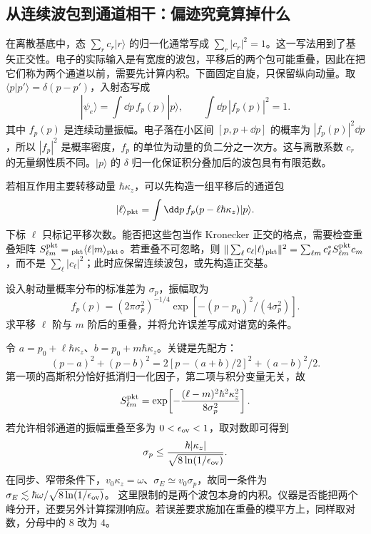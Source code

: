 \subsection{从连续波包到通道相干：偏迹究竟算掉什么}
\label{sec:electron-channel-coherence-worked}

在离散基底中，态 $\sum_r c_r|r\rangle$ 的归一化通常写成 $\sum_r|c_r|^2=1$。这一写法用到了基矢正交性。电子的实际输入是有宽度的波包，平移后的两个包可能重叠，因此在把它们称为两个通道以前，需要先计算内积。下面固定自旋，只保留纵向动量。取 $\langle p|p'\rangle=\delta(p-p')$，入射态写成
\begin{equation}
 |\psi_e\rangle=\int\dd p\,f_p(p)|p\rangle,\qquad
 \int\dd p\,|f_p(p)|^2=1.
 \label{eq:electron-channel-packet-normalization}
\end{equation}
其中 $f_p(p)$ 是连续动量振幅。电子落在小区间 $[p,p+\dd p]$ 的概率为 $|f_p(p)|^2\dd p$，所以 $|f_p|^2$ 是概率密度，$f_p$ 的单位为动量的负二分之一次方。这与离散系数 $c_r$ 的无量纲性质不同。$|p\rangle$ 的 $\delta$ 归一化保证积分叠加后的波包具有有限范数。

若相互作用主要转移动量 $\hbar\kappa_z$，可以先构造一组平移后的通道包
\begin{equation*}
 |\ell\rangle_{\rm pkt}=\int\dd p\,f_p(p-\ell\hbar\kappa_z)|p\rangle.
\end{equation*}
下标 $\ell$ 只标记平移次数。能否把这些包当作 Kronecker 正交的格点，需要检查重叠矩阵 $S_{\ell m}^{\rm pkt}={}_{\rm pkt}\langle\ell|m\rangle_{\rm pkt}$。若重叠不可忽略，则 $\|\sum_\ell c_\ell|\ell\rangle_{\rm pkt}\|^2=\sum_{\ell m}c_\ell^*S_{\ell m}^{\rm pkt}c_m$，而不是 $\sum_\ell|c_\ell|^2$；此时应保留连续波包，或先构造正交基。

\begin{exbox}[解析求出高斯通道的重叠与正交条件]
设入射动量概率分布的标准差为 $\sigma_p$，振幅取为
\begin{equation*}
 f_p(p)=(2\pi\sigma_p^2)^{-1/4}
 \exp[-(p-p_0)^2/(4\sigma_p^2)].
\end{equation*}
求平移 $\ell$ 阶与 $m$ 阶后的重叠，并将允许误差写成对谱宽的条件。

令 $a=p_0+\ell\hbar\kappa_z$、$b=p_0+m\hbar\kappa_z$。关键是先配方：
\begin{equation*}
 (p-a)^2+(p-b)^2=2[p-(a+b)/2]^2+(a-b)^2/2.
\end{equation*}
第一项的高斯积分恰好抵消归一化因子，第二项与积分变量无关，故
\begin{equation}
 S_{\ell m}^{\rm pkt}
 =\exp\!\left[-\frac{(\ell-m)^2\hbar^2\kappa_z^2}{8\sigma_p^2}\right].
 \label{eq:electron-channel-gaussian-overlap}
\end{equation}
若允许相邻通道的振幅重叠至多为 $0<\epsilon_{\rm ov}<1$，取对数即可得到
\begin{equation*}
 \sigma_p\le\frac{\hbar|\kappa_z|}{\sqrt{8\ln(1/\epsilon_{\rm ov})}}.
\end{equation*}
在同步、窄带条件下，$v_0\kappa_z=\omega$、$\sigma_E\simeq v_0\sigma_p$，故同一条件为
$\sigma_E\lesssim\hbar\omega/\sqrt{8\ln(1/\epsilon_{\rm ov})}$。
这里限制的是两个波包本身的内积。仪器是否能把两个峰分开，还要另外计算探测响应。若误差要求施加在重叠的模平方上，同样取对数，分母中的 $8$ 改为 $4$。
\end{exbox}

